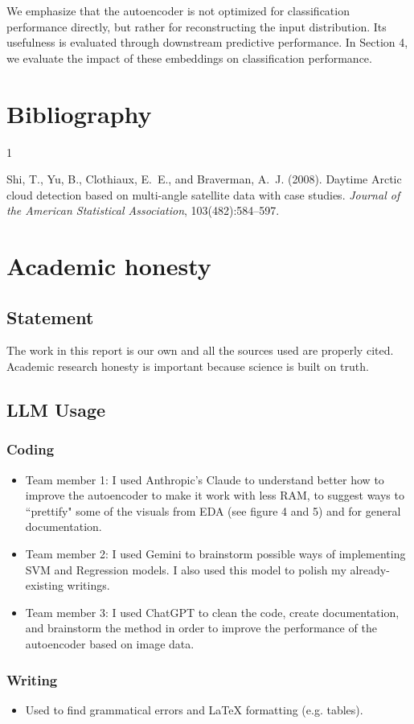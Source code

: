 \documentclass[10pt,letterpaper]{article}
\begin{document}
We emphasize that the autoencoder is not optimized for classification performance directly, but rather for reconstructing the input distribution. Its usefulness is evaluated through downstream predictive performance. In Section 4, we evaluate the impact of these embeddings on classification performance.



\section{Bibliography}
\begin{thebibliography}{1}

Shi, T., Yu, B., Clothiaux, E.~E., and Braverman, A.~J. (2008).
\newblock Daytime {Arctic} cloud detection based on multi-angle satellite data with case studies.
\newblock \textit{Journal of the American Statistical Association}, 103(482):584--597.

\end{thebibliography}




\appendix
\section{Academic honesty}
\subsection{Statement}
The work in this report is our own and all the sources used are properly cited. Academic research honesty is important because science is built on truth.
\subsection{LLM Usage}


\subsubsection*{Coding}
\begin{itemize}
    \item Team member 1: I used Anthropic's Claude to understand better how to improve the autoencoder to make it work with less RAM, to suggest ways to ``prettify" some of the visuals from EDA (see figure 4 and 5) and for general documentation.
    \item Team member 2: I used Gemini to brainstorm possible ways of implementing SVM and Regression models. I also used this model to polish my already-existing writings.
    \item Team member 3:  I used ChatGPT to clean the code, create documentation, and brainstorm the method in order to improve the performance of the autoencoder based on image data.
\end{itemize}

\subsubsection*{Writing}
\begin{itemize}
    \item Used to find grammatical errors and LaTeX formatting (e.g. tables).
\end{itemize}
\end{document}
